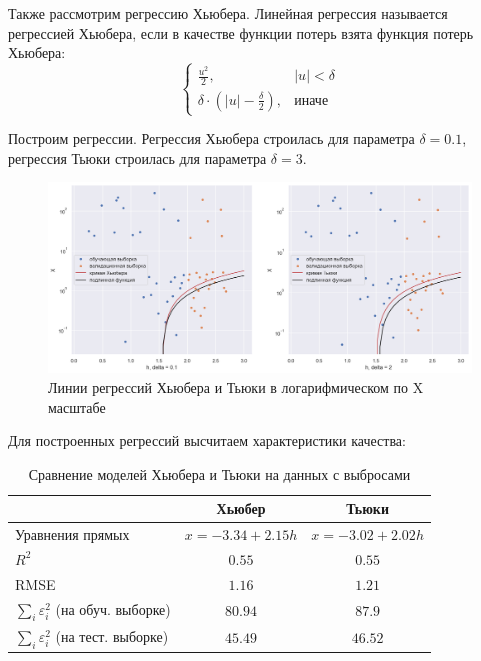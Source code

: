 \documentclass[a4paper,12pt]{article}
\begin{document}
Также рассмотрим регрессию Хьюбера. Линейная регрессия называется регрессией Хьюбера, если в качестве функции потерь взята функция потерь Хьюбера:
$$
\begin{cases}
    \frac{u^2}{2}, & |u| < \delta\\
    \delta \cdot \left( |u| - \frac{\delta}{2} \right), & \text{иначе}
\end{cases}
$$

Построим регрессии. Регрессия Хьюбера строилась для параметра $\delta = 0.1$, регрессия Тьюки строилась для параметра $\delta = 3$.

\begin{figure}[H]
    \centering
    \includegraphics[width=\linewidth]{src/img/линии_Тьюки_и_Хьюбера.png}
    \caption{Линии регрессий Хьюбера и Тьюки в логарифмическом по X масштабе}
\end{figure}

Для построенных регрессий высчитаем характеристики качества:

\begin{table}[H]
    \begin{center}
        \begin{tabular}{|l|c|c|}
            \hline
            & Хьюбер & Тьюки \\ \hline
            Уравнения прямых & $x = -3.34 + 2.15 h$ & $x = -3.02 + 2.02 h$ \\ \hline
            $R^2$ & $0.55$ & $0.55$ \\ \hline
            RMSE & $1.16$ & $1.21$ \\ \hline
            $\sum\limits_i \varepsilon_i^2$ (на обуч. выборке) & $80.94$ & $87.9$ \\ \hline
            $\sum\limits_i \varepsilon_i^2$ (на тест. выборке) & $45.49$ & $46.52$ \\ \hline
        \end{tabular}
        \caption{Сравнение моделей Хьюбера и Тьюки на данных с выбросами}
    \end{center}
\end{table}
\end{document}
